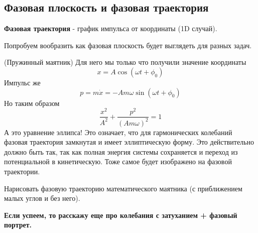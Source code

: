 \subsection{Фазовая плоскость и фазовая траектория}
\begin{definition}
    \textbf{Фазовая траектория} - график импульса от координаты (1D случай).
\end{definition}
Попробуем вообразить как фазовая плоскость будет выглядеть для разных задач.
\begin{example}(Пружинный маятник)
    Для него мы только что получили значение координаты
    \begin{equation*}
        x = A \cos(\omega t + \phi_0)
    \end{equation*}
    Импульс же
    \begin{equation*}
        p = m \dot{x} = -Am\omega \sin(\omega t + \phi_0)
    \end{equation*}
    Но таким образом
    \begin{equation*}
        \frac{x^2}{A^2} + \frac{p^2}{(A m \omega)^2} = 1
    \end{equation*}
    А это уравнение эллипса! Это означает, что для гармонических колебаний фазовая траектория замкнутая и имеет эллиптическую форму. Это действительно должно быть так, так как полная энергия системы сохраняется и переход из потенциальной в кинетическую. Тоже самое будет изображено на фазовой траектории.
\end{example}

\begin{prac}
    Нарисовать фазовую траекторию математического маятника (с приближением малых углов и без него).
\end{prac}

\textbf{Если успеем, то расскажу еще про колебания с затуханием + фазовый портрет.}